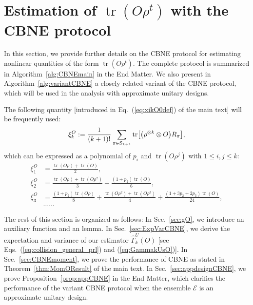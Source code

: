 \documentclass[aps,prl,twocolumn,nofootinbib,superscriptaddress,10pt]{revtex4-2}
\let\originalleft\left
\let\originalright\right
\renewcommand{\left}{\mathopen{}\mathclose\bgroup\originalleft}
\renewcommand{\right}{\aftergroup\egroup\originalright}
\DeclareMathOperator{\Tr}{tr}
\theoremstyle{plain}
\theoremstyle{definition}
\def\eqref#1{\textup{(\ref{#1})}}
\newcommand{\eref}[1]{Eq.~\textup{(\ref{#1})}}
\newcommand{\tref}[1]{Theorem~\ref{#1}}
\newcommand{\pref}[1]{Proposition~\ref{#1}}
\begin{document}
\section{Estimation of \texorpdfstring{$\Tr(O\rho^t)$}{} with  the CBNE protocol}\label{sec:CBNEmain}

In this section, we provide further details on the CBNE protocol for estimating nonlinear quantities of the form \(\Tr(O\rho^t)\).
The complete protocol is summarized in Algorithm~\ref{alg:CBNEmain} in the End Matter.
We also present in Algorithm~\ref{alg:variantCBNE} a closely related variant of the CBNE protocol, which will be used in the analysis with approximate unitary designs.


The following quantity [introduced in \eref{eq:xikO0def} of the main text] will be frequently used: 
\begin{equation}
\xi_k^{O} := \frac{1}{(k+1)! } \sum_{\pi\in \mathrm{S}_{k+1}}  \Tr\left[ \left(\rho^{\otimes k} \otimes O \right)R_\pi\right] ,
\end{equation}
which 
can be expressed as a polynomial of $p_i$ and $\Tr(O\rho^j)$ with $1\leq i,j\leq k$: 
\begin{align}\label{eq:xiORelation+}
\xi_1^{O}&=  \frac{\Tr(O\rho)+\Tr(O)}{2}, 
\nonumber\\ 
\xi_2^{O}&=  \frac{\Tr(O\rho)+\Tr(O\rho^2)}{3}+\frac{(1+p_2)\Tr(O)}{6},
\nonumber\\ 
\xi_3^{O}&=  \frac{(1+p_2)\Tr(O\rho)}{8} + \frac{\Tr(O\rho^2)+\Tr(O\rho^3)}{4}
+\frac{(1+3p_2+2p_3) \Tr(O)}{24}, 
\nonumber\\
&\dots \dots
\end{align} 


The rest of this section is organized as follows: 
In Sec.~\ref{sec:gO}, we introduce an  auxiliary function and an lemma.
In Sec.~\ref{sec:ExpVarCBNE}, we derive the expectation and variance of our estimator $\hat{\Gamma}_k^{U}(O)$ [see  Eqs.~\eqref{eq:collision_general_prl} and \eqref{eq:GammakUsO}]. 
In Sec.~\ref{sec:CBNEmoment}, we prove the performance of CBNE as stated in \tref{thm:MomOResult} of the main text. In Sec.~\ref{sec:appdesignCBNE}, we prove \pref{prop:appCBNE} in the End Matter, which clarifies the performance of the variant CBNE protocol when the ensemble $\mathcal E$ is an approximate unitary design.
\end{document}
